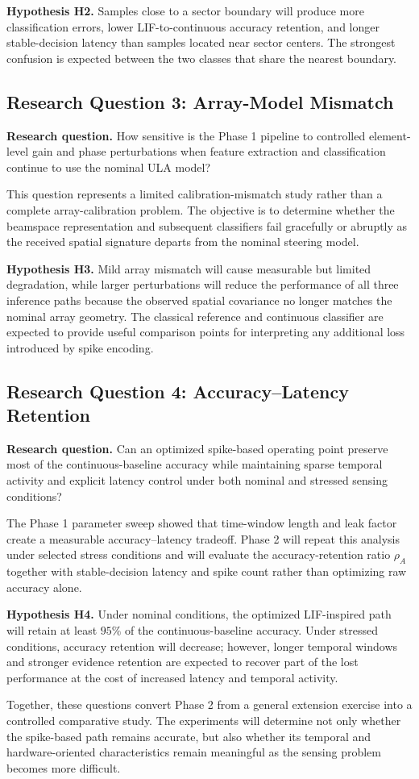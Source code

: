 \textbf{Hypothesis H2.} Samples close to a sector boundary will produce more classification errors, lower LIF-to-continuous accuracy retention, and longer stable-decision latency than samples located near sector centers. The strongest confusion is expected between the two classes that share the nearest boundary.

\subsection{Research Question 3: Array-Model Mismatch}

\textbf{Research question.} How sensitive is the Phase 1 pipeline to controlled element-level gain and phase perturbations when feature extraction and classification continue to use the nominal ULA model?

This question represents a limited calibration-mismatch study rather than a complete array-calibration problem. The objective is to determine whether the beamspace representation and subsequent classifiers fail gracefully or abruptly as the received spatial signature departs from the nominal steering model.

\textbf{Hypothesis H3.} Mild array mismatch will cause measurable but limited degradation, while larger perturbations will reduce the performance of all three inference paths because the observed spatial covariance no longer matches the nominal array geometry. The classical reference and continuous classifier are expected to provide useful comparison points for interpreting any additional loss introduced by spike encoding.

\subsection{Research Question 4: Accuracy--Latency Retention}

\textbf{Research question.} Can an optimized spike-based operating point preserve most of the continuous-baseline accuracy while maintaining sparse temporal activity and explicit latency control under both nominal and stressed sensing conditions?

The Phase 1 parameter sweep showed that time-window length and leak factor create a measurable accuracy--latency tradeoff. Phase 2 will repeat this analysis under selected stress conditions and will evaluate the accuracy-retention ratio $\rho_A$ together with stable-decision latency and spike count rather than optimizing raw accuracy alone.

\textbf{Hypothesis H4.} Under nominal conditions, the optimized LIF-inspired path will retain at least $95\%$ of the continuous-baseline accuracy. Under stressed conditions, accuracy retention will decrease; however, longer temporal windows and stronger evidence retention are expected to recover part of the lost performance at the cost of increased latency and temporal activity.

Together, these questions convert Phase 2 from a general extension exercise into a controlled comparative study. The experiments will determine not only whether the spike-based path remains accurate, but also whether its temporal and hardware-oriented characteristics remain meaningful as the sensing problem becomes more difficult.